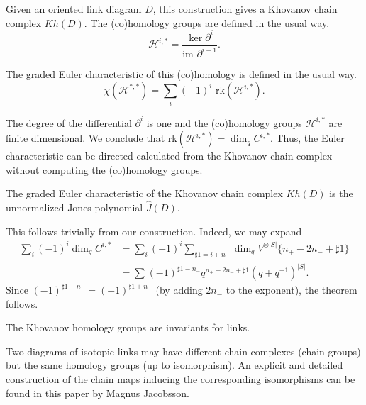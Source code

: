 Given an oriented link diagram $D$, this construction gives a Khovanov chain complex $Kh(D)$. The (co)homology groups are defined in the usual way. 
\begin{equation}
\label{eq:20}
\mathcal{H}^{i,*} = \frac{\ker \partial^i}{\text{im } \partial^{i-1}}.
\end{equation}

The graded Euler characteristic of this (co)homology is defined in the usual way.
\begin{equation}
\label{eq:21}
\chi (\mathcal{H^{*,*}}) = \sum_i^{} (-1)^i \text{ rk}(\mathcal{H}^{i,*}).
\end{equation}

The degree of the differential $\partial^i$ is one and the (co)homology groups $\mathcal{H}^{i,*}$ are finite dimensional. We conclude that rk$(\mathcal{H}^{i,*}) = \dim_q C^{i,*}$. Thus, the Euler characteristic can be directed calculated from the Khovanov chain complex without computing the (co)homology groups.

\begin{theorem}
\label{sec:cohom-groups-mathc-16}
The graded Euler characteristic of the Khovanov chain complex $Kh(D)$ is the unnormalized Jones polynomial $\hat{J}(D)$.
\end{theorem}

This follows trivially from our construction. Indeed, we may expand
\begin{align*}
  \sum_i^{} (-1)^i \dim_q C^{i,*} &= \sum_i^{} (-1)^i \sum_{\sharp 1 = i + n_-}^{} \dim_q V^{\otimes |S|}\{n_+ - 2n_- + \sharp 1\}\\
   &= \sum_{}^{} (-1)^{\sharp 1 - n_-} q^{n_+ - 2n_- + \sharp 1} (q + q^{-1})^{|S|}.
\end{align*}
Since $(-1)^{\sharp 1 - n_-} = (-1)^{\sharp 1+n_-}$ (by adding $2n_-$ to the exponent), the theorem follows.

\begin{theorem}
\label{sec:categ-hatj_lq}
The Khovanov homology groups are invariants for links.
\end{theorem}

Two diagrams of isotopic links may have different chain complexes (chain groups) but the same homology groups (up to isomorphism). An explicit and detailed construction of the chain maps inducing the corresponding isomorphisms can be found in this paper \cite{jacobsson2004invariant} by Magnus Jacobsson.


